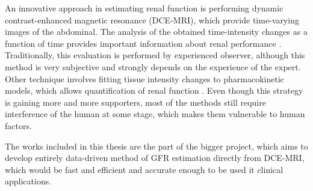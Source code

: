 An innovative approach in estimating renal function is performing dynamic contrast-enhanced magnetic resonance (DCE-MRI), which provide time-varying images of the abdominal.
The analysis of the obtained time-intensity changes as a function of time provides important information about renal performance \cite{bokacheva2008assessment, khalifa2014models}. Traditionally, this evaluation is performed by experienced observer, although this method is very subjective and strongly depends on the experience of the expert. Other technique involves fitting tissue intensity changes to pharmacokinetic models, which allows quantification of renal function \cite{khalifa2014models}. Even though this strategy is gaining more and more supporters, most of the methods still require interference of the human at some stage, which makes them vulnerable to human factors. 

The works included in this thesis are the part of the bigger project, which aims to develop entirely data-driven method of GFR estimation directly from DCE-MRI, which would be fast and efficient and accurate enough to be used it clinical applications.  
 

